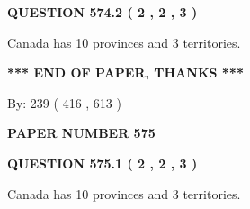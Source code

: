 \documentclass[12pt]{article}
\begin{document}
\vspace{0.2in}
  
{\textbf{\Large{QUESTION
574.2 
 ( 2 , 2 , 3 )
}}}
  
  
 
 
\noindent{}
 
 
Canada has 10  provinces and 3 territories.
 
 
 
 
   
   
 \vspace{0.2in}
 
   
   
   
   
\vspace{1.0in} 
{\textbf{\large{ *** END OF PAPER, THANKS *** }}} 
   
   
\hspace{1.0in} By: 
 239 ( 416 ,  613 )
   
   
   
   
\newpage 
\setcounter{page}{ 
   575001 } 
   
   
   
   
 {\textbf{ \Large{ PAPER NUMBER  575  }}}
   
   
\vspace{0.2in}
   
   
   
   
   
   
 \vspace{0.2in}
 
 
 
 
   
   
  
\vspace{0.2in}
  
{\textbf{\Large{QUESTION
575.1 
 ( 2 , 2 , 3 )
}}}
  
  
 
 
\noindent{}
 
 
Canada has 10  provinces and 3 territories.
 
 
 
 
  
\vspace{0.2in}
  
\end{document}
